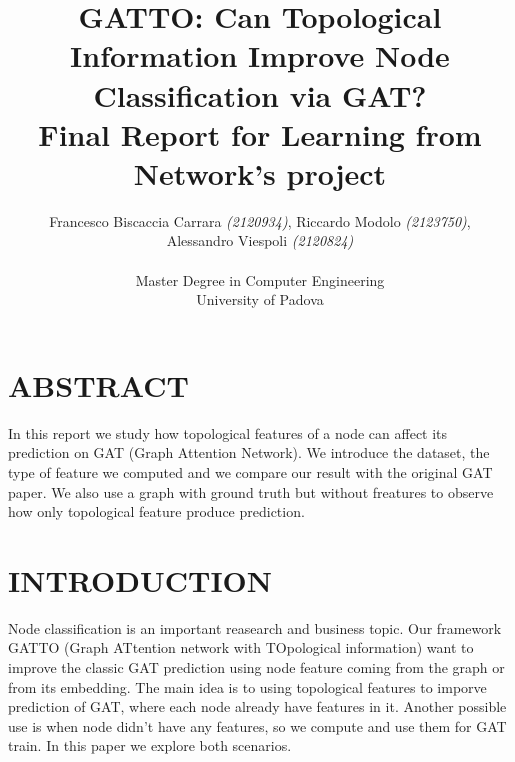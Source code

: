 \documentclass[12pt,conference]{ieeeconf} %
\title{GATTO: Can Topological Information Improve Node Classification via GAT?\\
\large Final Report for Learning from Network's project \\}
\author{Francesco Biscaccia Carrara \textit{(2120934)}, Riccardo Modolo \textit{(2123750)},\\ Alessandro Viespoli \textit{(2120824)} %
\\\\ Master Degree in Computer Engineering \\
University of Padova \\
}
\begin{document}
\maketitle
\thispagestyle{plain}
\pagestyle{plain}

\section{ABSTRACT} 
In this report we study how topological features of a node can affect its prediction on GAT (Graph Attention Network).
We introduce the dataset, the type of feature we computed and we compare our result with the 
original GAT paper. We also use a graph with ground truth but without freatures to observe how only 
topological feature produce prediction. 

\section{INTRODUCTION} 
Node classification is an important reasearch and business topic.
Our framework GATTO (Graph ATtention network with TOpological information) want to 
improve the classic GAT prediction using node feature coming from the graph or from its 
embedding. The main idea is to using topological features to imporve prediction of GAT, where each node already have features in it. 
Another possible use is when node didn't have any features, so we compute and use them for GAT train.
In this paper we explore both scenarios. 

\end{document}
